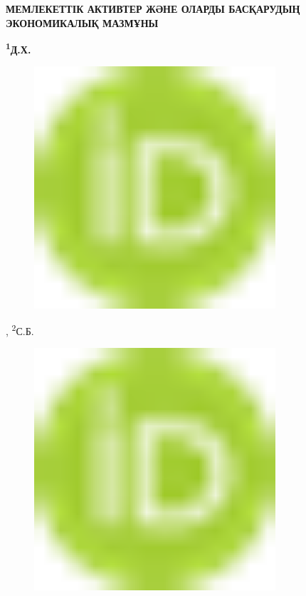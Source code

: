 
{\bfseries МЕМЛЕКЕТТІК АКТИВТЕР ЖӘНЕ ОЛАРДЫ БАСҚАРУДЫҢ ЭКОНОМИКАЛЫҚ
МАЗМҰНЫ}

{\bfseries \textsuperscript{1}Д.Х.
\begin{figure}[H]
	\centering
	\includegraphics[width=0.8\textwidth]{media/ekon2/image1}
	\caption*{}
\end{figure}

, \textsuperscript{2}С.Б.
\begin{figure}[H]
	\centering
	\includegraphics[width=0.8\textwidth]{media/ekon2/image1}
	\caption*{}
\end{figure}

}
